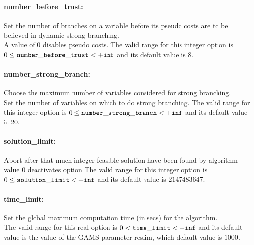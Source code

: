 \paragraph{number\_before\_trust:}\label{sec:number_before_trust} Set the number of branches on a variable before its pseudo costs are to be believed in dynamic strong branching. $\;$ \\
 A value of 0 disables pseudo costs. The valid range for this integer option is
$0 \le {\tt number\_before\_trust } <  {\tt +inf}$
and its default value is $8$.


\paragraph{number\_strong\_branch:}\label{sec:number_strong_branch} Choose the maximum number of variables considered for strong branching. $\;$ \\
 Set the number of variables on which to do strong
branching. The valid range for this integer option is
$0 \le {\tt number\_strong\_branch } <  {\tt +inf}$
and its default value is $20$.


\paragraph{solution\_limit:}\label{sec:solution_limit} Abort after that much integer feasible solution have been found by algorithm $\;$ \\
 value 0 deactivates option The valid range for this integer option is
$0 \le {\tt solution\_limit } <  {\tt +inf}$
and its default value is $2147483647$.


\paragraph{time\_limit:}\label{sec:time_limit} Set the global maximum computation time (in secs) for the algorithm. $\;$ \\
 The valid range for this real option is 
$0 <  {\tt time\_limit } <  {\tt +inf}$
and its default value is the value of the GAMS parameter reslim, which default value is $1000$.


